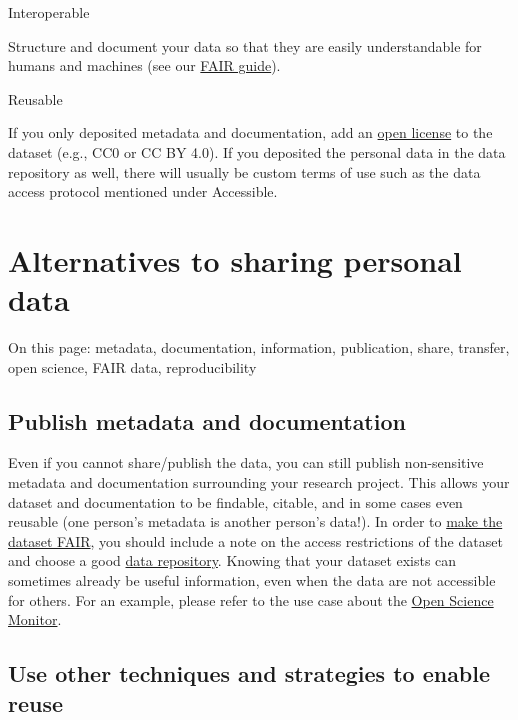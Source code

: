 \documentclass[
]{book}
\begin{document}
Interoperable

Structure and document your data so that they are easily understandable
for humans and machines (see our
\href{https://www.uu.nl/en/research/research-data-management/guides/how-to-make-your-data-fair}{FAIR guide}).

Reusable

If you only deposited metadata and documentation, add an
\href{https://www.uu.nl/en/research/research-data-management/guides/publishing-and-sharing-data}{open license}
to the dataset (e.g., CC0 or CC BY 4.0). If you deposited the personal data
in the data repository as well, there will usually be custom terms of use
such as the data access protocol mentioned under Accessible.

\hypertarget{sharing-reuse-alternatives}{%
\section{Alternatives to sharing personal data}\label{sharing-reuse-alternatives}}

On this page: metadata, documentation, information, publication, share, transfer,
open science, FAIR data, reproducibility

\hypertarget{publish-metadata}{%
\subsection{Publish metadata and documentation}\label{publish-metadata}}

Even if you cannot share/publish the data, you can still publish non-sensitive
metadata and documentation surrounding your research project. This allows your
dataset and documentation to be findable, citable, and in some cases even
reusable (one person's metadata is another person's data!). In order to
\href{https://www.uu.nl/en/research/research-data-management/guides/how-to-make-your-data-fair}{make the dataset FAIR},
you should include a note on the access restrictions of the dataset and choose
a good \href{https://tools.uu.nl/repository-decision-tool/}{data repository}.
Knowing that your dataset exists can sometimes already be useful information,
even when the data are not accessible for others. For an example, please refer to
the use case about the \protect\hyperlink{open-science-questionnaire}{Open Science Monitor}.

\hypertarget{reuse-strategies}{%
\subsection{Use other techniques and strategies to enable reuse}\label{reuse-strategies}}
\end{document}
